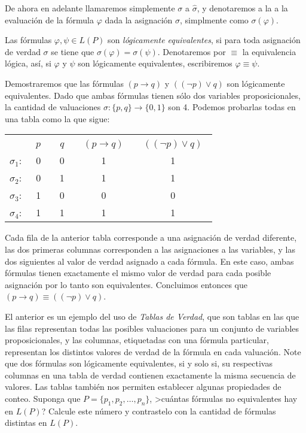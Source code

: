 De ahora en adelante llamaremos simplemente $\sigma$ a $\hat\sigma$, y denotaremos a la
a la evaluaci\'on de la f\'ormula $\varphi$ dada la asignaci\'on $\sigma$, simplmente como $\sigma(\varphi)$.

\begin{definicion}
Las f\'ormulas $\varphi,\psi\in L(P)$ son {\em l\'ogicamente equivalentes}, si para toda asignaci\'on de verdad $\sigma$ se tiene
que $\sigma(\varphi)=\sigma(\psi)$. 
Denotaremos por $\equiv$ la equivalencia l\'ogica, as\'{i}, si $\varphi$ y $\psi$ son l\'ogicamente equivalentes, escribiremos
$\varphi\equiv \psi$.
\end{definicion}

\begin{ejemplo}
Demostraremos que las f\'ormulas $(p\to q)$ y $((\neg p) \vee q)$ son l\'ogicamente equivalentes.
Dado que ambas f\'ormulas tienen s\'olo dos variables proposicionales, la cantidad de valuaciones $\sigma:\{p,q\}\to \{0,1\}$
son 4. Podemos probarlas todas en una tabla como la que sigue:

\begin{center}
\begin{tabular}{lcccc} %
& ~$p$~ & ~$q$~ & ~$(p\to q)$~ & ~$((\neg p) \vee q)$~ \\ \cline{2-5} 
$\sigma_1$: & 0 & 0 & 1 & 1\\ %
$\sigma_2$: & 0 & 1 & 1 & 1\\ %
$\sigma_3$: & 1 & 0 & 0 & 0\\ %
$\sigma_4$: & 1 & 1 & 1 & 1\\ %
\end{tabular}
\end{center}

Cada fila de la anterior tabla corresponde a una asignaci\'on de verdad diferente, las dos primeras columnas
corresponden a las asignaciones a las variables, y las dos siguientes al valor de verdad asignado a cada f\'ormula.
En este caso, ambas f\'ormulas tienen exactamente el mismo valor de verdad para cada posible asignaci\'on por lo tanto
son equivalentes. Concluimos entonces que $(p\to q)\equiv ((\neg p)\vee q)$.
\end{ejemplo}

El anterior es un ejemplo del uso de {\em Tablas de Verdad}, que son tablas en las que las filas representan
todas las posibles valuaciones para un conjunto de variables proposicionales, 
y las columnas, etiquetadas con una f\'ormula particular,
representan los distintos valores de verdad de la f\'ormula en cada valuaci\'on.
Note que dos f\'ormulas son l\'ogicamente equivalentes, si y solo si, su respectivas columnas en una tabla de verdad
contienen exactamente la misma secuencia de valores.
Las tablas tambi\'en nos permiten establecer algunas propiedades de conteo.
Suponga que $P=\{p_1,p_2,\ldots, p_n\}$, >cu\'antas f\'ormulas no equivalentes hay en $L(P)$? 
Calcule este n\'umero y contrastelo con la cantidad de f\'ormulas distintas en $L(P)$.

